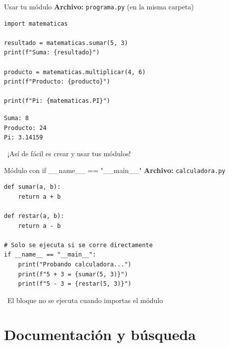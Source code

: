 \documentclass{beamer}
\begin{document}
\begin{frame}[fragile]{Usar tu módulo \faPlay}
\textbf{Archivo:} \texttt{programa.py} (en la misma carpeta)
\begin{lstlisting}
import matematicas

resultado = matematicas.sumar(5, 3)
print(f"Suma: {resultado}")

producto = matematicas.multiplicar(4, 6)
print(f"Producto: {producto}")

print(f"Pi: {matematicas.PI}")
\end{lstlisting}

\vspace{-0.2cm}
\begin{tcolorbox}[colback=green!10,colframe=green,title={\small\faArrowCircleRight \ Salida},coltitle=fg0,left=3pt,right=3pt,top=2pt,bottom=2pt,boxsep=1pt]
\small\texttt{Suma: 8\\
Producto: 24\\
Pi: 3.14159}
\end{tcolorbox}

\vspace{-0.1cm}
\begin{notebox}
\small\faCheckCircle\ ¡Así de fácil es crear y usar tus módulos!
\end{notebox}
\end{frame}

\begin{frame}[fragile]{Módulo con if \_\_name\_\_ == "\_\_main\_\_" \faCodeBranch}
\textbf{Archivo:} \texttt{calculadora.py}
\begin{lstlisting}
def sumar(a, b):
    return a + b

def restar(a, b):
    return a - b

# Solo se ejecuta si se corre directamente
if __name__ == "__main__":
    print("Probando calculadora...")
    print(f"5 + 3 = {sumar(5, 3)}")
    print(f"5 - 3 = {restar(5, 3)}")
\end{lstlisting}

\vspace{-0.1cm}
\begin{notebox}
\small\faInfoCircle\ El bloque no se ejecuta cuando importas el módulo
\end{notebox}
\end{frame}

\section{Documentación y búsqueda}
\end{document}
